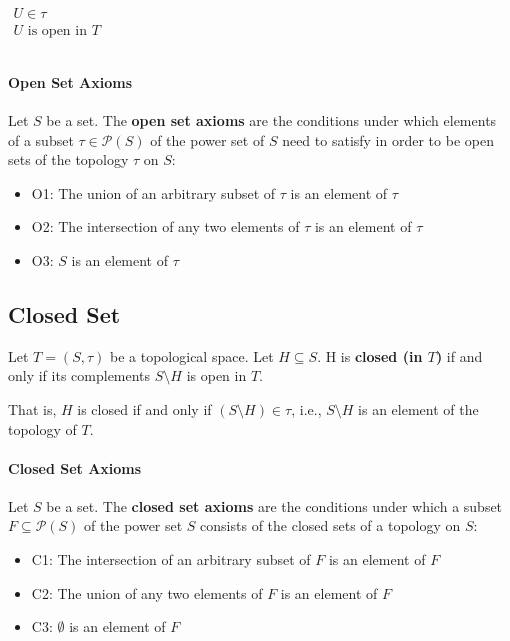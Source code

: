 \begin{math}
  \begin{array}{l}
    \\
    U \in \tau \\
    U \text{ is open in } T\\
    \\
  \end{array}
\end{math}


\paragraph{Open Set Axioms}
\label{sec:open-set-axioms}

Let $S$ be a set. The \textbf{open set axioms} are the conditions
under which elements of a subset $\tau \in \mathcal{P}(S)$ of the
power set of $S$ need to satisfy in order to be open sets of the
topology $\tau$ on $S$:

\begin{itemize}
\item O1: The union of an arbitrary subset of $\tau$ is an element of
$\tau$
\item O2: The intersection of any two elements of $\tau$ is an element
of $\tau$
\item O3: $S$ is an element of $\tau$
\end{itemize}



\subsection{Closed Set}
\label{sec:closed-set}

Let $T = (S, \tau)$ be a topological space. Let $H \subseteq S$. H is
\textbf{closed (in $T$)} if and only if its complements
$S \setminus H$ is open in $T$.

That is, $H$ is closed if and only if $(S \setminus H) \in \tau$,
i.e., $S \setminus H$ is an element of the topology of $T$.


\paragraph{Closed Set Axioms}

Let $S$ be a set. The \textbf{closed set axioms} are the conditions
under which a subset $F \subseteq \mathcal{P}(S)$ of the power set $S$
consists of the closed sets of a topology on $S$:

\begin{itemize}
\item C1: The intersection of an arbitrary subset of $F$ is an element
  of $F$
\item C2: The union of any two elements of $F$ is an element of $F$
\item C3: $\emptyset$ is an element of $F$
\end{itemize}



